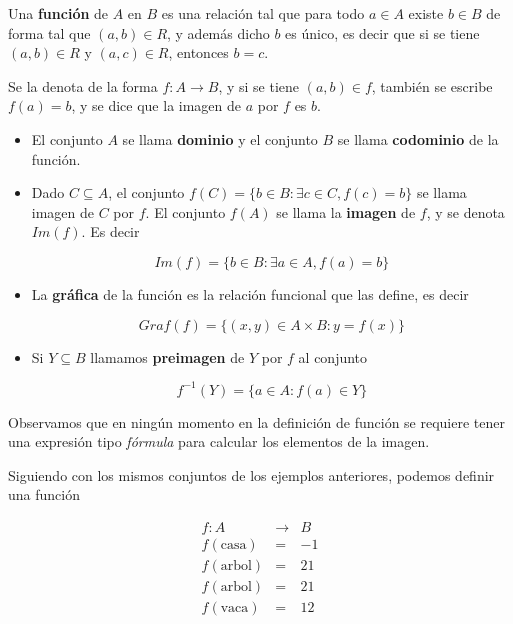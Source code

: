 \begin{definition}[Función]  \label{funcion}

Una \textbf{función} de $A$ en $B$ es una relación tal que para todo $a \in A$ existe $b \in B$ de forma tal que $(a,b) \in R$, y además dicho $b$ es único, es decir que si se tiene $(a,b) \in R$ y $(a,c) \in R$, entonces $b=c$.

Se la denota de la forma $f : A \to B$, y si se tiene $(a,b) \in f$, también se escribe $f(a) = b$, y se dice que la imagen de $a$ por $f$ es $b$.

\begin{itemize}
\item El conjunto $A$ se llama \textbf{dominio}  y el conjunto $B$ se llama \textbf{codominio}  de la función.

\item Dado $C \subseteq A$, el conjunto $f(C) = \{b \in B : \exists c \in C, f(c) = b\}$ se llama imagen de $C$ por $f$.  El conjunto $f(A)$ se llama la \textbf{imagen}  de $f$, y se denota $Im(f)$.  Es decir

$$ Im(f) = \{ b \in B : \exists a \in A, f(a) = b \} $$

\item La \textbf{gráfica} de la función es la relación funcional que las define, es decir

$$ Graf(f) = \{ (x,y) \in A \times B : y = f(x) \} $$

\item Si $Y \subseteq B$ llamamos \textbf{preimagen} de $Y$ por $f$ al conjunto

$$ f^{-1}(Y) = \{a \in A : f(a) \in Y \}$$
\end{itemize}
\end{definition}

\begin{observation}
Observamos que en ningún momento en la definición de función se requiere tener una expresión tipo \emph{fórmula} para calcular los elementos de la imagen.
\end{observation}

\begin{example}

Siguiendo con los mismos conjuntos de los ejemplos anteriores, podemos definir una función

\begin{eqnarray*} f : A &\to& B \\
f(\textrm{casa}) &=& -1 \\
f(\textrm{arbol}) &=& 21 \\
f(\textrm{arbol}) &=& 21 \\
f(\textrm{vaca}) &=& 12 \end{eqnarray*} 

\end{example}

